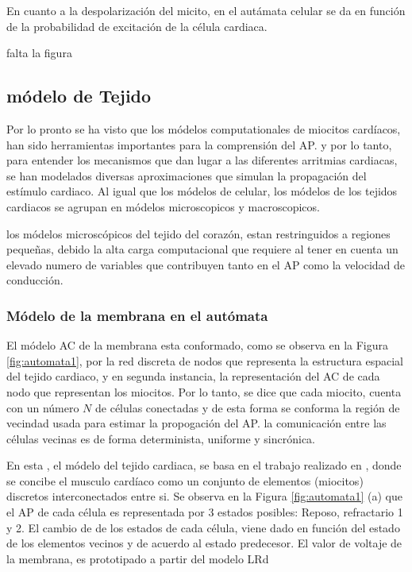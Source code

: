 En cuanto a la despolarización del micito, en el autámata celular se da en
función de la probabilidad de excitación de la célula cardiaca.

falta la figura


\subsection{módelo de Tejido}

Por lo pronto se ha visto que los módelos computationales de miocitos cardíacos,
han sido herramientas importantes para la comprensión del \ac{AP}. y por lo
tanto, para entender los mecanismos que dan lugar a las diferentes arritmias
cardiacas, se han modelados diversas aproximaciones que simulan la propagación
del estímulo cardiaco. Al igual que los módelos de celular, los módelos de los
tejidos cardiacos se agrupan en módelos microscopicos y macroscopicos.

los módelos microscópicos del tejido del corazón, estan restringuidos a
regiones pequeñas, debido la alta carga computacional que requiere al tener en
cuenta un elevado numero de variables que contribuyen  tanto en el \ac{AP} como
la velocidad de conducción.


\subsubsection{Módelo de la membrana en el autómata}

El módelo \ac{AC} de la membrana esta conformado, como se observa en la Figura
\ref{fig:automata1},  por la red discreta de nodos que representa la estructura
espacial del tejido cardiaco, y en segunda instancia, la representación del \ac{AC} de cada nodo que representan los miocitos. Por lo tanto, se dice que cada miocito,
cuenta con un número $N$ de células conectadas y de esta forma se
conforma la región de vecindad  usada para  estimar la propogación del \ac{AP}.
la comunicación entre las células vecinas  es de forma determinista, uniforme  y
sincrónica.

En esta \nombreDoc, el módelo del tejido cardiaca, se basa en el
trabajo realizado en \cite{Alonso-Atienza05}, donde se concibe el musculo
cardíaco como un conjunto de elementos (miocitos) discretos interconectados
entre si. Se observa en la Figura \ref{fig:automata1} (a) que el \ac{AP} de
cada célula es representada por 3 estados posibles:  Reposo, refractario 1 y 2.
El cambio de  de los estados de cada célula, viene dado en función del estado
de los elementos vecinos y de  acuerdo al estado predecesor. El valor de voltaje
de la membrana, es prototipado a partir del modelo \ac{LRd}
\cite{Alonso-Atienza05}



